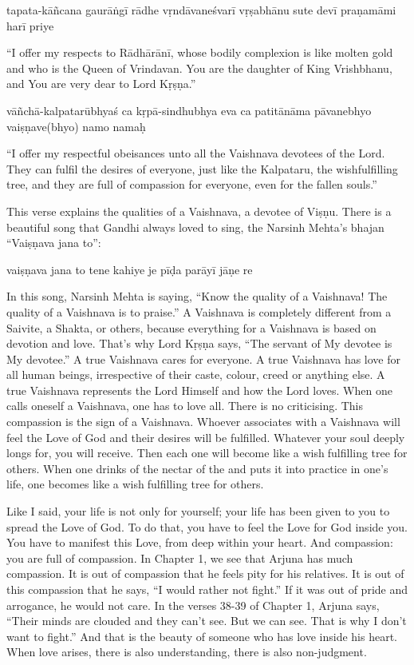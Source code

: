 tapata-kāñcana gaurāṅgī rādhe vṛndāvaneśvarī vṛṣabhānu sute devī praṇamāmi harī priye

“I offer my respects to Rādhārānī, whose bodily complexion is like molten gold and who is the Queen of Vrindavan. You are the daughter of King Vrishbhanu, and You are very dear to Lord Kṛṣṇa.”

vāñchā-kalpatarūbhyaś ca kṛpā-sindhubhya eva ca patitānāma pāvanebhyo vaiṣṇave(bhyo) namo namaḥ

“I offer my respectful obeisances unto all the Vaishnava devotees of the Lord. They can fulfil the desires of everyone, just like the Kalpataru, the wishfulfilling tree, and they are full of compassion for everyone, even for the fallen souls.”

This verse explains the qualities of a Vaishnava, a devotee of Viṣṇu. There is a beautiful song that Gandhi always loved to sing, the Narsinh Mehta’s bhajan “Vaiṣṇava jana to”:

vaiṣṇava jana to tene kahiye je pīḍa parāyī jāṇe re

In this song, Narsinh Mehta is saying, “Know the quality of a Vaishnava! The quality of a Vaishnava is to praise.” A Vaishnava is completely different from a Saivite, a Shakta, or others, because everything for a Vaishnava is based on devotion and love. That’s why Lord Kṛṣṇa says, “The servant of My devotee is My devotee.” A true Vaishnava cares for everyone. A true Vaishnava has love for all human beings, irrespective of their caste, colour, creed or anything else. A true Vaishnava represents the Lord Himself and how the Lord loves. When one calls oneself a Vaishnava, one has to love all. There is no criticising. This compassion is the sign of a Vaishnava. Whoever associates with a Vaishnava will feel the Love of God and their desires will be fulfilled. Whatever your soul deeply longs for, you will receive. Then each one will become like a wishfulfilling tree for others. When one drinks of the nectar of the  and puts it into practice in one’s life, one becomes like a wishfulfilling tree for others.

Like I said, your life is not only for yourself; your life has been given to you to spread the Love of God. To do that, you have to feel the Love for God inside you. You have to manifest this Love, from deep within your heart. And compassion: you are full of compassion. In Chapter 1, we see that Arjuna has much compassion. It is out of compassion that he feels pity for his relatives. It is out of this compassion that he says, “I would rather not fight.” If it was out of pride and arrogance, he would not care. In the verses 38-39 of Chapter 1, Arjuna says, “Their minds are clouded and they can’t see. But we can see. That is why I don’t want to fight.” And that is the beauty of someone who has love inside his heart. When love arises, there is also understanding, there is also non-judgment.

